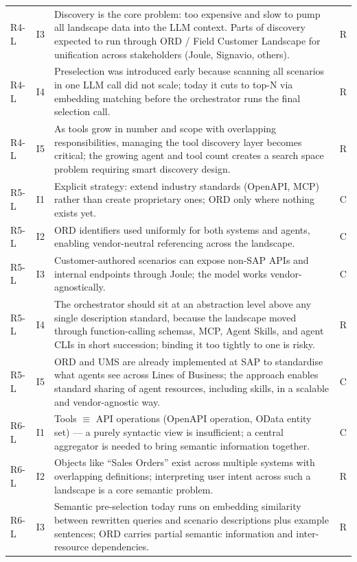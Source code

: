 \begin{longtable}{@{} p{0.9cm} p{0.7cm} p{13.8cm} p{0.7cm} @{}}
R4-L & I3 & Discovery is the core problem: too expensive and slow to pump all landscape data into the LLM context. Parts of discovery expected to run through ORD / Field Customer Landscape for unification across stakeholders (Joule, Signavio, others). & R \\
R4-L & I4 & Preselection was introduced early because scanning all scenarios in one LLM call did not scale; today it cuts to top-N via embedding matching before the orchestrator runs the final selection call. & R \\
R4-L & I5 & As tools grow in number and scope with overlapping responsibilities, managing the tool discovery layer becomes critical; the growing agent and tool count creates a search space problem requiring smart discovery design. & R \\
\midrule
R5-L & I1 & Explicit strategy: extend industry standards (OpenAPI, MCP) rather than create proprietary ones; ORD only where nothing exists yet. & C \\
R5-L & I2 & ORD identifiers used uniformly for both systems and agents, enabling vendor-neutral referencing across the landscape. & C \\
R5-L & I3 & Customer-authored scenarios can expose non-SAP APIs and internal endpoints through Joule; the model works vendor-agnostically. & C \\
R5-L & I4 & The orchestrator should sit at an abstraction level above any single description standard, because the landscape moved through function-calling schemas, MCP, Agent Skills, and agent CLIs in short succession; binding it too tightly to one is risky. & R \\
R5-L & I5 & ORD and UMS are already implemented at SAP to standardise what agents see across Lines of Business; the approach enables standard sharing of agent resources, including skills, in a scalable and vendor-agnostic way. & C \\
\midrule
R6-L & I1 & Tools $\equiv$ API operations (OpenAPI operation, OData entity set) — a purely syntactic view is insufficient; a central aggregator is needed to bring semantic information together. & C \\
R6-L & I2 & Objects like ``Sales Orders'' exist across multiple systems with overlapping definitions; interpreting user intent across such a landscape is a core semantic problem. & R \\
R6-L & I3 & Semantic pre-selection today runs on embedding similarity between rewritten queries and scenario descriptions plus example sentences; ORD carries partial semantic information and inter-resource dependencies. & R \\

\end{longtable}
